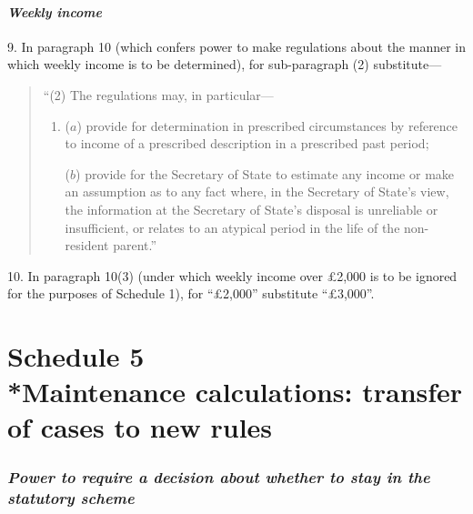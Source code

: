 \documentclass[12pt,a4paper]{article}
\begin{document}
{{}


\subsection*{\itshape Weekly income}

9. In paragraph 10 (which confers power to make regulations about the manner in which weekly income is to be determined), for sub-paragraph (2) substitute—
\begin{quotation}
“(2) The regulations may, in particular—
\begin{enumerate}\item[]
($a$) provide for determination in prescribed circumstances by reference to income of a prescribed description in a prescribed past period;

($b$) provide for the Secretary of State to estimate any income or make an assumption as to any fact where, in the Secretary of State's view, the information at the Secretary of State's disposal is unreliable or insufficient, or relates to an atypical period in the life of the non-resident parent.”
\end{enumerate}
\end{quotation}


\medskip

10. In paragraph 10(3) (under which weekly income over £2,000 is to be ignored for the purposes of Schedule 1), for “£2,000” substitute “£3,000”.

}

\part[Schedule 5 --- Maintenance calculations: transfer of cases to new rules]{Schedule 5\\*Maintenance calculations: transfer of cases to new rules}

\renewcommand\parthead{--- Schedule 5}

\section*{\itshape Power to require a decision about whether to stay in the statutory scheme}
\end{document}
